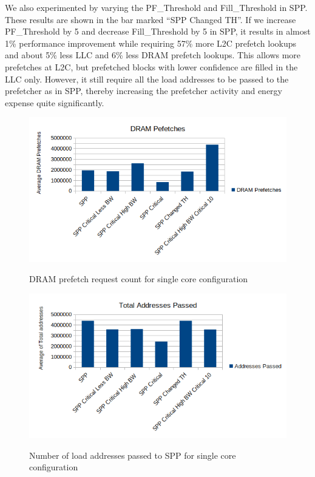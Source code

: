 We also experimented by varying the PF\_Threshold and Fill\_Threshold in SPP. These results are shown in the bar marked ``SPP Changed TH''.
If we increase PF\_Threshold by 5 and decrease Fill\_Threshold by 5 in SPP, it results in almost 1\% performance improvement while requiring 57\% more L2C prefetch lookups and about 5\% less LLC and 6\% less DRAM prefetch lookups. This allows more prefetches at L2C, but prefetched blocks with lower confidence are filled in the LLC only. However, it still require all the load addresses to be passed to the prefetcher as in SPP, thereby increasing the prefetcher activity and energy expense quite significantly.
\begin{figure}[H]
{\includegraphics[scale=0.7]{images/DRAM BW comparison single core.png}}
\caption{DRAM prefetch request count for single core configuration}
\label{fig:dram-prefetch-count}
\end{figure}
\begin{figure}[H]
{\includegraphics[scale=0.7]{images/Total Addresses single.png}}
\caption{Number of load addresses passed to SPP for single core configuration}
\label{fig:address-passed}
\end{figure}

